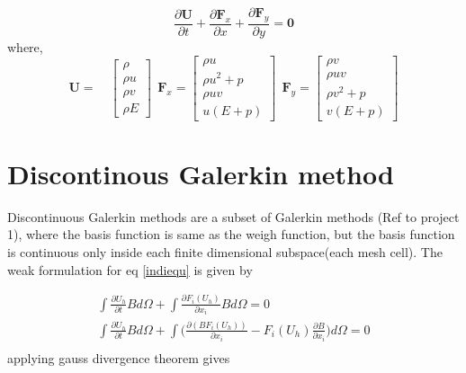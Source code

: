 \documentclass[12pt]{elsarticle}
\begin{document}
	\begin{equation}\label{eq:one}
		\frac{\partial \mathbf{U}}{\partial t} + \frac{\partial \mathbf{F}_x}{\partial x} + \frac{\partial \mathbf{F}_y}{\partial y} = \mathbf{0}
	\end{equation} where,
	$$
	\mathbf{U} =
	\quad
	\begin{bmatrix}
		\rho \\
		\rho u \\
		\rho v \\
		\rho E \end{bmatrix}
	\
	\
	\mathbf{F}_x = \begin{bmatrix}
		\rho u\\
		\rho u^2+p \\
		\rho uv \\
		u (E+p)
	\end{bmatrix}
	\
	\
	\mathbf{F}_y = \begin{bmatrix}
		\rho v\\
		\rho uv \\
		\rho v^2+p \\
		v (E+p)
	\end{bmatrix}
	$$
	\section{Discontinous Galerkin method}
	Discontinuous Galerkin methods are a subset of Galerkin methods (Ref to project 1), where the basis function is same as the weigh function, but the basis function is continuous only inside each finite dimensional subspace(each mesh cell). The weak formulation for eq \ref{indiequ} is given by
	
	\begin{equation}
		\begin{gathered}
			\int \frac{\partial U_h}{\partial t} B d\Omega + \int \frac{\partial F_i(U_h)}{\partial x_i}B d\Omega=0\\
			\int \frac{\partial U_h}{\partial t} B d\Omega + \int \Big( \frac{\partial (BF_i(U_h))}{\partial x_i}-F_i(U_h)\frac{\partial B}{\partial x_i} \Big) d\Omega=0\\
		\end{gathered}
	\end{equation} 
	applying gauss divergence theorem gives
	
\end{document}

